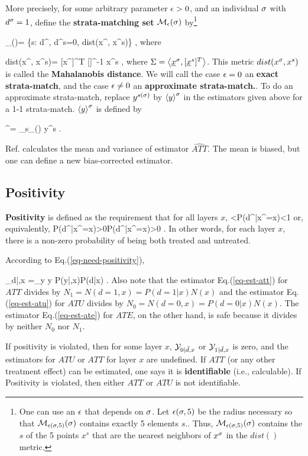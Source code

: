 More precisely, 
for some arbitrary
parameter $\epsilon>0$,
and an individual $\sigma$
with $d^\sigma=1$,
define
the {\bf strata-matching set} 
${\cal M}_{\epsilon}(\sigma)$ by\footnote{
One can use an $\epsilon$
that depends on $\sigma$.
Let $\epsilon(\sigma, 5)$
be the radius necessary
so that ${\cal M}_{\epsilon(\sigma, 5)}(\sigma)$
contains exactly 5 elements $s$..
Thus, ${\cal M}_{\epsilon(\sigma, 5)}(\sigma)$
contains the $s$ of the
 5 points $x^s$ that are the
nearest neighbors of $x^\sigma$
in the $dist()$ metric.}

\beq
\calm_{\eps}(\s)=
\{s: d^, d^s=0, 
dist(x^\s, x^s)\leq \eps \}
\;,
\eeq
where

\beq
dist(x^\s, x^s)=
[x^\s]^T [\Sigma]^{-1} x^s
\;,
\eeq
where $\Sigma = \left\langle{\underline{x}}^\sigma, [{\underline{x}}^s]^T\right\rangle$.
 This
metric $dist(x^\sigma, x^s)$ is
called the {\bf Mahalanobis distance}.
We will call
the case $\epsilon=0$ an {\bf  exact strata-match},
and
the case
$\epsilon\neq 0$ 
 an {\bf approximate strata-match.}.
To do an approximate strata-match,
replace $y^{s(\sigma)}$ 
by
$\left\langle y\right\rangle^\sigma$ 
in 
the estimators 
given above 
for a 1-1 strata-match.
$\left\langle y\right\rangle^\sigma$ 
is defined by

\beq
{}^\s=
\sum_{s\in \calm_{\eps}(\s)}
y^s
\;.
\eeq

Ref.\cite{book-mixtape}
calculates the mean and variance
of estimator $\widehat{ATT}$. 
The mean is biased,
but one can define a new
bias-corrected estimator.


\subsection{Positivity}


{\bf Positivity} is defined as the
requirement that for all layers $x$,
<P(d^|x^\s=x)<1
\eeq
or, equivalently, 
\beq
P(d^|x^\s=x)>0P(d^|x^\s=x)>0
\;.
\eeq
In other words, 
for each layer $x$,
there is
a non-zero
probability of being both treated 
and untreated.

According to  Eq.(\ref{eq-need-positivity}),

\beq
\caly_{d|\td,x}
=\sum_{y} y P(y|\td,x)P(d|x)
\;.
\eeq
Also note
that the estimator
Eq.(\ref{eq-est-att})
for $ATT$ divides by $N_1=N(d=1,x)=P(d=1|x)N(x)$
and 
the estimator
Eq.(\ref{eq-est-atu})
for $ATU$ divides by $N_0=N(d=0,x)= P(d=0|x)N(x)$.
The estimator
Eq.(\ref{eq-est-ate}) for $ATE$,
on the other hand, 
is safe because 
it divides by neither $N_0$ nor $N_1$.

If positivity is violated,
then 
for some 
layer $x$, 
 ${\cal Y}_{0|{\tilde{d}},x}$ or ${\cal Y}_{1|{\tilde{d}},x}$ 
is zero, 
and the estimators
for $ATU$ or $ATT$ for layer $x$ are
undefined.
If $ATT$ (or any
other treatment effect)  can be estimated,
one says it is {\bf identifiable} (i.e.,
calculable). If Positivity is violated, then
either $ATT$ or $ATU$ is not identifiable.

